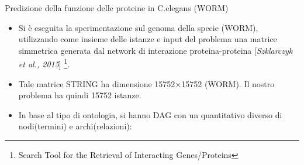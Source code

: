 \documentclass[9pt]{beamer}
\begin{document}
\begin{tframe}{Predizione della funzione delle proteine in C.elegans (WORM)}
\begin{itemize}
\item Si è eseguita la sperimentazione sul genoma della specie
 (WORM), utilizzando come insieme delle  istanze e input del problema una matrice simmetrica generata dal network di interazione proteina-proteina  [\emph{Szklarczyk et al., 2015}] \footnote{\footnotesize{Search Tool for the Retrieval of Interacting Genes/Proteins}}.
\item Tale matrice STRING ha dimensione 15752×15752 (WORM). Il nostro problema ha quindi 15752 istanze.
\item In base al tipo di ontologia, si hanno DAG con un quantitativo diverso di nodi(termini) e archi(relazioni): 

\begin{table}[h]
\centering
{}

\label{DAG_desc}
\end{table}
\end{itemize}
\end{tframe}
\end{document}
